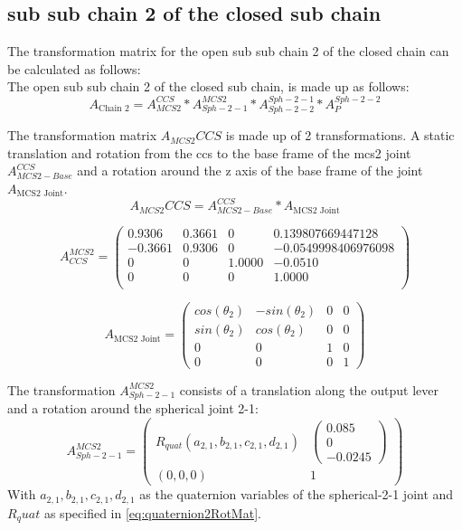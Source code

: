 \documentclass[12pt,a4paper]{article}
\begin{document}
\subsection{sub sub chain 2 of the closed sub chain}
The transformation matrix for the open sub sub chain 2 of the closed chain can be calculated as follows: \\
The open sub sub chain 2 of the closed sub chain, is made up as follows:
\begin{equation}
    A_{\text{Chain 2}} = A_{MCS2}^{CCS} * A_{Sph-2-1}^{MCS2} * A_{Sph-2-2}^{Sph-2-1} * A_{P}^{Sph-2-2}  
\end{equation}

The transformation matrix $A_{MCS2}{CCS}$ is made up of 2 transformations. A static translation and rotation from the ccs to the base frame of the mcs2 joint $A_{MCS2-Base}^{CCS}$ and a rotation around the z axis of the base frame of the joint $A_{\text{MCS2 Joint}}$.
\begin{equation}
    A_{MCS2}{CCS} = A_{MCS2-Base}^{CCS} * A_{\text{MCS2 Joint}}
\end{equation}

\begin{equation}
    A_{CCS}^{MCS2} = 
    \begin{pmatrix}
    0.9306   & 0.3661  &       0   & 0.139807669447128 \\
    -0.3661   & 0.9306   &        0  & -0.0549998406976098\\
    0        &     0    &  1.0000   & -0.0510\\
    0       &      0    &      0    & 1.0000\\
    \end{pmatrix}
\end{equation}

\begin{equation}
    A_{\text{MCS2 Joint}} = 
    \begin{pmatrix}
        cos(\theta_2) & -sin(\theta_2)& 0 & 0\\
        sin(\theta_2)&  cos(\theta_2)& 0 & 0 \\
        0 & 0 & 1 & 0 \\
        0 & 0 & 0 & 1
    \end{pmatrix}
\end{equation}

The transformation $A_{Sph-2-1}^{MCS2}$ consists of a translation along the output lever and a rotation around the spherical joint 2-1:
\begin{equation}
        A_{Sph-2-1}^{MCS2} =
        \begin{pmatrix}
        R_{quat}(a_{2,1},b_{2,1},c_{2,1},d_{2,1}) & \begin{pmatrix} 0.085 \\0 \\-0.0245 \end{pmatrix}\\
        (0, 0, 0)& 1
        \end{pmatrix}
\end{equation}
With $a_{2,1},b_{2,1},c_{2,1},d_{2,1}$ as the quaternion variables of the spherical-2-1 joint and $R_quat$ as specified in \eqref{eq:quaternion2RotMat}.\\
\end{document}
